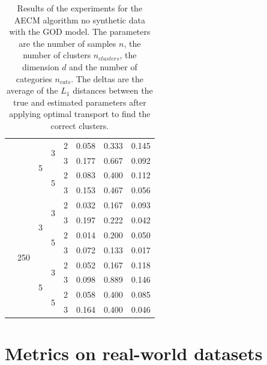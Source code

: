 \begin{table}[H]
\begin{minipage}{.48\columnwidth}
\begin{adjustbox}{width=\columnwidth}
\begin{tabular}{lllllrrr}
\cline{3-8} \cline{4-8}
 &  & \multirow[t]{4}{*}{5} & \multirow[t]{2}{*}{3} & 2 & 0.058 & 0.333 & 0.145 \\
 &  &  &  & 3 & 0.177 & 0.667 & 0.092 \\
\cline{4-8}
 &  &  & \multirow[t]{2}{*}{5} & 2 & 0.083 & 0.400 & 0.112 \\
 &  &  &  & 3 & 0.153 & 0.467 & 0.056 \\
\cline{2-8} \cline{3-8} \cline{4-8}
 & \multirow[t]{8}{*}{250} & \multirow[t]{4}{*}{3} & \multirow[t]{2}{*}{3} & 2 & 0.032 & 0.167 & 0.093 \\
 &  &  &  & 3 & 0.197 & 0.222 & 0.042 \\
\cline{4-8}
 &  &  & \multirow[t]{2}{*}{5} & 2 & 0.014 & 0.200 & 0.050 \\
 &  &  &  & 3 & 0.072 & 0.133 & 0.017 \\
\cline{3-8} \cline{4-8}
 &  & \multirow[t]{4}{*}{5} & \multirow[t]{2}{*}{3} & 2 & 0.052 & 0.167 & 0.118 \\
 &  &  &  & 3 & 0.098 & 0.889 & 0.146 \\
\cline{4-8}
 &  &  & \multirow[t]{2}{*}{5} & 2 & 0.058 & 0.400 & 0.085 \\
 &  &  &  & 3 & 0.164 & 0.400 & 0.046 \\
\cline{1-8} \cline{2-8} \cline{3-8} \cline{4-8}
\bottomrule
\end{tabular}
\end{adjustbox}
\caption{Results of the experiments for the AECM algorithm no synthetic data with the GOD model. The parameters are the number of samples $n$, the number of clusters $n_{clusters}$, the dimension $d$ and the number of categories $n_{cats}$. The deltas are the average of the $L_1$ distances between the true and estimated parameters after applying optimal transport to find the correct clusters.}
\label{tab:results_god}
\end{minipage}
\end{table}

\section{Metrics on real-world datasets}
\label{appendix:metrics_real}

